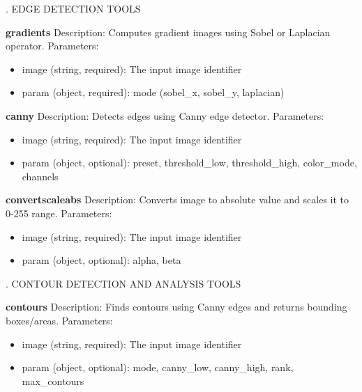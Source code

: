 \documentclass[runningheads]{llncs}
\begin{document}
\begin{tcolorbox}
\vspace{4mm}
. EDGE DETECTION TOOLS
\vspace{2mm}

\noindent \textbf{gradients}
\newline Description: Computes gradient images using Sobel or Laplacian operator.
\newline Parameters:
\begin{itemize}
    \item image (string, required): The input image identifier
    \item param (object, required): mode (sobel\_x, sobel\_y, laplacian)
\end{itemize}

\noindent \textbf{canny}
\newline Description: Detects edges using Canny edge detector.
\newline Parameters:
\begin{itemize}
    \item image (string, required): The input image identifier
    \item param (object, optional): preset, threshold\_low, threshold\_high, color\_mode, channels
\end{itemize}

\noindent \textbf{convertscaleabs}
\newline Description: Converts image to absolute value and scales it to 0-255 range.
\newline Parameters:
\begin{itemize}
    \item image (string, required): The input image identifier
    \item param (object, optional): alpha, beta
\end{itemize}

\vspace{4mm}
. CONTOUR DETECTION AND ANALYSIS TOOLS
\vspace{2mm}

\noindent \textbf{contours}
\newline Description: Finds contours using Canny edges and returns bounding boxes/areas.
\newline Parameters:
\begin{itemize}
    \item image (string, required): The input image identifier
    \item param (object, optional): mode, canny\_low, canny\_high, rank, max\_contours
\end{itemize}


\end{tcolorbox}
\end{document}
